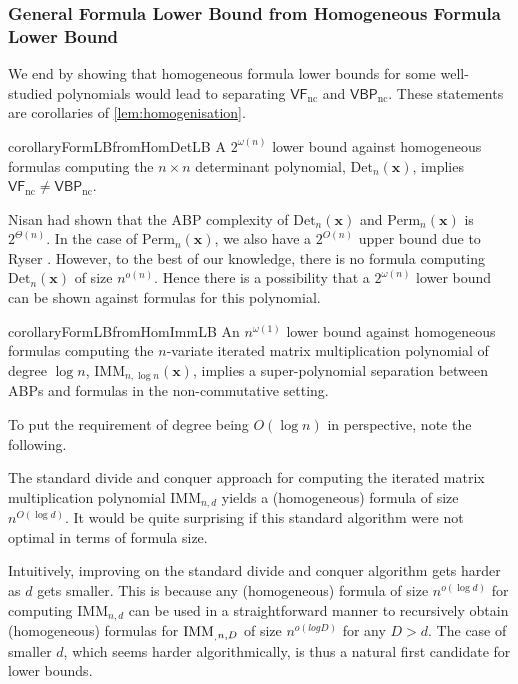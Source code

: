 \documentclass[10pt,a4paper]{article}
\def\vecx{\mathbf{x}}
\def\ncVF{\mathsf{VF}_{\text{nc}}}
\def\ncVBP{\mathsf{VBP}_{\text{nc}}}
\newcommand{\Det}[1]{\mathrm{Det}_{#1}}
\newcommand{\Perm}[1]{\mathrm{Perm}_{#1}}
\newcommand{\imm}[2]{\mathrm{IMM}_{#1,#2}}
\begin{document}
%
%
%
%
%
%

%
%
%
%

%
%

\subsubsection*{General Formula Lower Bound from Homogeneous Formula Lower Bound}

We end by showing that homogeneous formula lower bounds for some well-studied polynomials would lead to separating $\ncVF$ and $\ncVBP$.
These statements are corollaries of \autoref{lem:homogenisation}.

\begin{restatable}{corollary}{FormLBfromHomDetLB}\label{cor:FormLBfromHomDetLB}
	A $2^{\omega(n)}$ lower bound against homogeneous formulas computing the $n \times n$ determinant polynomial, $\Det{n}(\vecx)$, implies $\ncVF \neq \ncVBP$.
\end{restatable}

\begin{remark}
	Nisan \cite{N91} had shown that the ABP complexity of $\Det{n}(\vecx)$ and $\Perm{n}(\vecx)$ is $2^{\Theta(n)}$. 
	In the case of $\Perm{n}(\vecx)$, we also have a $2^{O(n)}$ upper bound due to Ryser \cite{R63}.
	However, to the best of our knowledge, there is no formula computing $\Det{n}(\vecx)$ of size $n^{o(n)}$. 
	Hence there is a possibility that a $2^{\omega(n)}$ lower bound can be shown against formulas for this polynomial.
\end{remark}

\begin{restatable}{corollary}{FormLBfromHomImmLB}\label{cor:FormLBfromHomImmLB}
	An $n^{\omega(1)}$ lower bound against homogeneous formulas computing the $n$-variate iterated matrix multiplication polynomial of degree $\log n$, $\imm{n}{\log n}(\vecx)$, implies a super-polynomial separation between ABPs and formulas in the non-commutative setting.
\end{restatable}

\noindent To put the requirement of degree being $O(\log n)$ in perspective, note the following.

\begin{remark}
	The standard divide and conquer approach for computing the iterated matrix multiplication polynomial $\imm{n}{d}$ yields a (homogeneous) formula of size $n^{O(\log d)}$. 
	It would be quite surprising if this standard algorithm were not optimal in terms of formula size.

	Intuitively, improving on the standard divide and conquer algorithm gets harder as $d$ gets smaller. 
	This is because any (homogeneous) formula of size $n^{o(\log d)}$ for computing $\imm{n}{d}$ can be used in a straightforward manner to recursively obtain (homogeneous) formulas for $\imm_{n,D}$ of size $n^{o(logD)}$ for any $D > d$. 
	The case of smaller $d$, which seems harder algorithmically, is thus a natural first candidate for lower bounds.
\end{remark}
\end{document}
